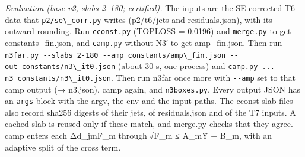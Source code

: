 \documentclass[
]{article}
\begin{document}
\emph{Evaluation (base v2, slabs 2--180; certified).} The inputs are the
SE-corrected T6 data that \texttt{p2/se\textbackslash{}\_corr.py} writes
(p2/t6/jets and residuals.json), with its outward rounding. Run
\texttt{cconst.py} (TOPLOSS = 0.0196) and \texttt{merge.py} to get
constants\_fin.json, and \texttt{camp.py} without N3′ to get
amp\_fin.json. Then run
\texttt{n3far.py\ -\/-slabs\ 2-180\ -\/-amp\ constants/amp\textbackslash{}\_fin.json\ -\/-out\ constants/n3\textbackslash{}\_it0.json}
(about 30 s, one process) and
\texttt{camp.py\ ...\ -\/-n3\ constants/n3\textbackslash{}\_it0.json}.
Then run n3far once more with \texttt{-\/-amp} set to that camp output
(→ n3.json), camp again, and \texttt{n3boxes.py}. Every output JSON has
an \texttt{args} block with the argv, the env and the input paths. The
cconst slab files also record sha256 digests of their jets, of
residuals.json and of the T7 inputs. A cached slab is reused only if
these match, and merge.py checks that they agree. camp enters each
Δd\_jmF\_m through √F\_m ≤ A\_mȲ + B\_m, with an adaptive split of the
cross term.
\end{document}
